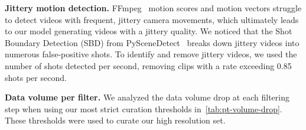 \textbf{Jittery motion detection.} FFmpeg~\citep{ffmpeg} motion scores and motion vectors struggle to detect videos with frequent, jittery camera movements,
which ultimately leads to our model generating videos with a jittery quality.
We noticed that the Shot Boundary Detection (SBD) from PySceneDetect~\citep{pyscenedetect} breaks down jittery videos into numerous false-positive shots.
To identify and remove jittery videos, we used the number of shots detected per second, removing clips with a rate exceeding 0.85 shots per second.

\textbf{Data volume per filter.} We analyzed the data volume drop at each filtering step when using our most strict curation thresholds in~\cref{tab:pt-volume-drop}.
These thresholds were used to curate our high resolution set.

\begin{table}
    \centering
    \caption{\textbf{Volume drop during high resolution set curation.}
    Note that our data acceptance rate with these thresholds is less than 1\%.
    }
    \label{tab:pt-volume-drop}
\end{table}




